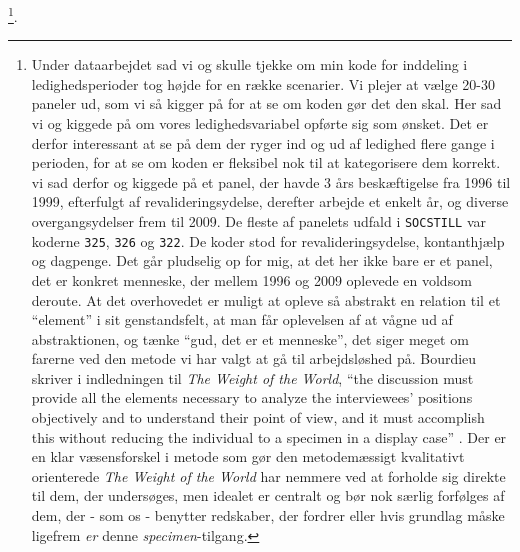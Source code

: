 \footnote{Under dataarbejdet sad vi og skulle tjekke om min kode for inddeling i ledighedsperioder tog højde for en række scenarier. Vi plejer at vælge 20-30 paneler ud, som vi så kigger på for at se om koden gør det den skal. Her sad vi og kiggede på om vores ledighedsvariabel opførte sig som ønsket. Det er derfor interessant at se på dem der ryger ind og ud af ledighed flere gange i perioden, for at se om koden er fleksibel nok til at kategorisere dem korrekt. vi sad derfor og kiggede på et panel, der havde 3 års beskæftigelse fra 1996 til 1999, efterfulgt af revalideringsydelse, derefter arbejde et enkelt år, og diverse overgangsydelser frem til 2009. De fleste af panelets udfald i \texttt{SOCSTILL} var koderne \texttt{325}, \texttt{326} og \texttt{322}. De koder stod for revalideringsydelse, kontanthjælp og dagpenge. Det går pludselig op for mig, at det her ikke bare er et panel, det er konkret menneske, der mellem 1996 og 2009 oplevede en voldsom deroute. At det overhovedet er muligt at opleve så abstrakt en relation til et “element” i sit genstandsfelt, at man får oplevelsen af at vågne ud af abstraktionen, og tænke “gud, det er et menneske”, det siger meget om farerne ved den metode vi har valgt at gå til arbejdsløshed på. Bourdieu skriver i indledningen til \emph{The Weight of the World}, “the discussion must provide all the elements necessary to analyze the interviewees' positions objectively and to understand their point of view, and it must accomplish this without reducing the individual to a specimen in a display case” \parencite[2]{Bourdieu1999}. Der er en klar væsensforskel i metode som gør den metodemæssigt kvalitativt orienterede \emph{The Weight of the World} har nemmere ved at forholde sig direkte til dem, der undersøges, men idealet er centralt og bør nok særlig forfølges af dem, der - som os - benytter redskaber, der fordrer eller hvis grundlag måske ligefrem \emph{er} denne \emph{specimen}-tilgang.}. 
%
